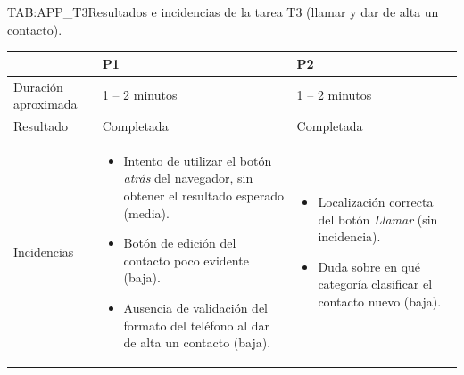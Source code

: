 \begin{table}[Incidencias T3]{TAB:APP_T3}{Resultados e
incidencias de la tarea T3 (llamar y dar de alta un contacto).}
\begin{center}
\begin{tabular}{p{3.5cm}p{4.5cm}p{4.5cm}}
\toprule
& \textbf{P1} & \textbf{P2} \\
\midrule
Duración aproximada    & 1 -- 2 minutos & 1 -- 2 minutos \\
Resultado              & Completada     & Completada \\
\midrule
Incidencias &
\begin{itemize}\setlength\itemsep{0pt}\setlength\parsep{0pt}
\item Intento de utilizar el botón \emph{atrás} del navegador, sin obtener el resultado esperado (media).
\item Botón de edición del contacto poco evidente (baja).
\item Ausencia de validación del formato del teléfono al dar de alta un contacto (baja).
\end{itemize}
&
\begin{itemize}\setlength\itemsep{0pt}\setlength\parsep{0pt}
\item Localización correcta del botón \emph{Llamar} (sin incidencia).
\item Duda sobre en qué categoría clasificar el contacto nuevo (baja).
\end{itemize}\\
\bottomrule
\end{tabular}
\end{center}
\end{table}
\FloatBarrier

